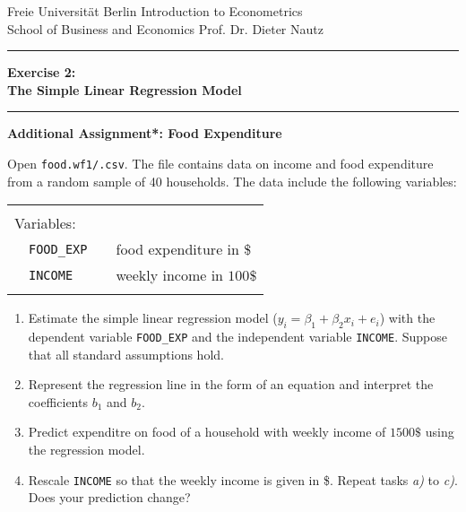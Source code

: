 \documentclass[11pt]{article}
\begin{document}
\renewcommand{\labelenumi}{\alph{enumi})}

\onehalfspacing

\small{Freie Universität Berlin \hfill Introduction to Econometrics \\
School of Business and Economics \hfill Prof. Dr. Dieter Nautz}


\vspace{0.5cm}


\hrule

\begin{center}

\Large{\textbf{Exercise 2: \\
The Simple Linear Regression Model}}

\end{center}

\vspace{0.1cm}

\hrule



\textbf{Additional Assignment*: Food Expenditure}

Open \texttt{food.wf1/.csv}. The file contains data on income and food expenditure from a random sample of 40 households. The data include the following variables:
\vspace{0.2cm}

\begin{tabular}{|p{0.3cm} p{2cm} c p{10.5cm}|}
  \hline
  \multicolumn{4}{|l|}{}\\
  \multicolumn{2}{|l}{Variables:} & &  \\
  & \texttt{FOOD\_EXP} && food expenditure in \$ \\
  & \texttt{INCOME} && weekly income in $100\$$ \\
  \multicolumn{4}{|l|}{}\\
  \hline
\end{tabular}

\begin{enumerate}
\item Estimate the simple linear regression model ($y_i=\beta_1 + \beta_2x_i + e_i$) with the dependent variable \texttt{FOOD\_EXP} and the independent variable \texttt{INCOME}. Suppose that all  standard assumptions hold.
\item Represent the regression line in the form of an equation and interpret the coefficients $b_1$ and $b_2$. 
\item Predict expenditre on food of a household with weekly income of $1500\$$ using the regression model.
\item Rescale \texttt{INCOME} so that the weekly income is given in \$. Repeat tasks  \textit{a)} to \textit{c)}. Does your prediction change?

\end{enumerate}
\end{document}
